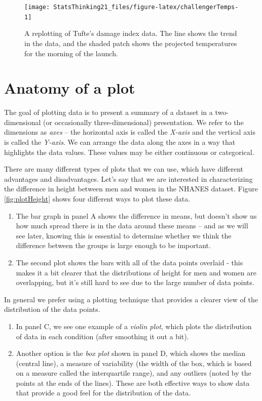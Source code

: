 \documentclass[12pt,]{book}
\providecommand{\tightlist}{%
  \setlength{\itemsep}{0pt}\setlength{\parskip}{0pt}}
\theoremstyle{definition}
\theoremstyle{definition}
\theoremstyle{definition}
\theoremstyle{remark}
\begin{document}
\begin{figure}
\texttt{[image: StatsThinking21\_files/figure-latex/challengerTemps-1]} \caption{A replotting of Tufte's damage index data. The line shows the trend in the data, and the shaded patch shows the projected temperatures for the morning of the launch.}\label{fig:challengerTemps}
\end{figure}

\hypertarget{anatomy-of-a-plot}{%
\section{Anatomy of a plot}\label{anatomy-of-a-plot}}

The goal of plotting data is to present a summary of a dataset in a two-dimensional (or occasionally three-dimensional) presentation. We refer to the dimensions as \emph{axes} -- the horizontal axis is called the \emph{X-axis} and the vertical axis is called the \emph{Y-axis}. We can arrange the data along the axes in a way that highlights the data values. These values may be either continuous or categorical.

There are many different types of plots that we can use, which have different advantages and disadvantages. Let's say that we are interested in characterizing the difference in height between men and women in the NHANES dataset. Figure \ref{fig:plotHeight} shows four different ways to plot these data.

\begin{enumerate}
\def\labelenumi{\arabic{enumi}.}
\tightlist
\item
  The bar graph in panel A shows the difference in means, but doesn't show us how much spread there is in the data around these means -- and as we will see later, knowing this is essential to determine whether we think the difference between the groups is large enough to be important.\\
\item
  The second plot shows the bars with all of the data points overlaid - this makes it a bit clearer that the distributions of height for men and women are overlapping, but it's still hard to see due to the large number of data points.
\end{enumerate}

In general we prefer using a plotting technique that provides a clearer view of the distribution of the data points.

\begin{enumerate}
\def\labelenumi{\arabic{enumi}.}
\setcounter{enumi}{2}
\tightlist
\item
  In panel C, we see one example of a \emph{violin plot}, which plots the distribution of data in each condition (after smoothing it out a bit).\\
\item
  Another option is the \emph{box plot} shown in panel D, which shows the median (central line), a measure of variability (the width of the box, which is based on a measure called the interquartile range), and any outliers (noted by the points at the ends of the lines). These are both effective ways to show data that provide a good feel for the distribution of the data.
\end{enumerate}
\end{document}
